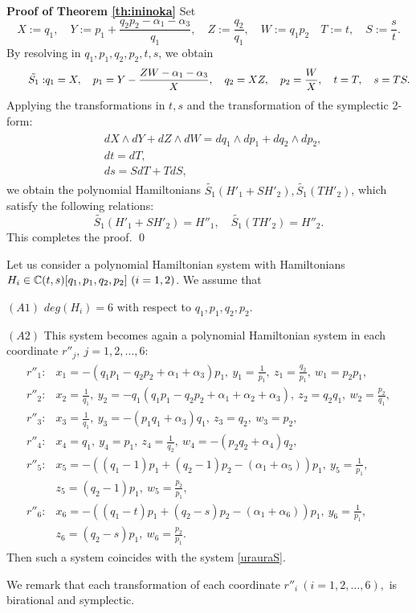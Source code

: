{\bf Proof of Theorem \ref{th:ininoka}}
Set
\begin{equation*}
X:=q_1, \quad Y:=p_1+\frac{q_2p_2-\alpha_1-\alpha_3}{q_1}, \quad Z:=\frac{q_2}{q_1}, \quad W:=q_1p_2 \quad T:=t, \quad S:=\frac{s}{t}.
\end{equation*}
By resolving in $q_1,p_1,q_2,p_2,t,s$, we obtain
\begin{equation}\tag*{$\tilde{S_1}:$}
q_1=X, \quad p_1=Y-\frac{ZW-\alpha_1-\alpha_3}{X}, \quad q_2=XZ, \quad p_2=\frac{W}{X}, \quad t=T, \quad s=TS.
\end{equation}
Applying the transformations in $t,s$ and the transformation of the symplectic 2-form:
\begin{align}
\begin{split}
&dX \wedge dY +dZ \wedge dW=dq_1 \wedge dp_1 +dq_2 \wedge dp_2,\\
&dt=dT,\\
&ds=SdT+TdS,
\end{split}
\end{align}
we obtain the polynomial Hamiltonians $\tilde{S_1}(H'_1+SH'_2),\tilde{S_1}(TH'_2)$, which satisfy the following relations:
$$
\tilde{S_1}(H'_1+SH'_2)=H''_1, \quad \tilde{S_1}(TH'_2)=H''_2.
$$
This completes the proof. \qed




\begin{thm}\label{holoURAURA}
Let us consider a polynomial Hamiltonian system with Hamiltonians $H_i \in {\Bbb C}(t,s)[q_1,p_1,q_2,p_2] \ (i=1,2)$. We assume that

$(A1)$ $deg(H_i)=6$ with respect to $q_1,p_1,q_2,p_2$.

$(A2)$ This system becomes again a polynomial Hamiltonian system in each coordinate $r''_j, \ j=1,2,\dots,6${\rm : \rm}
\begin{align}
\begin{split}
r''_1:&x_1=-(q_1p_1-q_2p_2+\alpha_1+\alpha_3)p_1, \ y_1=\frac{1}{p_1}, \ z_1=\frac{q_2}{p_1}, \ w_1=p_2p_1,\\
r''_2:&x_2=\frac{1}{q_1}, \ y_2=-q_1(q_1p_1-q_2p_2+\alpha_1+\alpha_2+\alpha_3), \ z_2=q_2q_1, \ w_2=\frac{p_2}{q_1},\\
r''_3:&x_3=\frac{1}{q_1},\ y_3=-(p_1q_1+\alpha_3)q_1,\ z_3=q_2,\ w_3=p_2,\\
r''_4:&x_4=q_1, \ y_4=p_1, \ z_4=\frac{1}{q_2}, \ w_4=-(p_2q_2+\alpha_4)q_2,\\
r''_5:&x_5=-((q_1-1)p_1+(q_2-1)p_2-(\alpha_1+\alpha_5))p_1, \ y_5=\frac{1}{p_1},\\
&z_5=(q_2-1)p_1, \ w_5=\frac{p_2}{p_1},\\
r''_6:&x_6=-((q_1-t)p_1+(q_2-s)p_2-(\alpha_1+\alpha_6))p_1, \ y_6=\frac{1}{p_1},\\
&z_6=(q_2-s)p_1, \ w_6=\frac{p_2}{p_1}.
\end{split}
\end{align}
Then such a system coincides with the system \eqref{urauraS}.
\end{thm}
We remark that each transformation of each coordinate $r''_i \ (i=1,2,\dots,6),$ is birational and symplectic.

